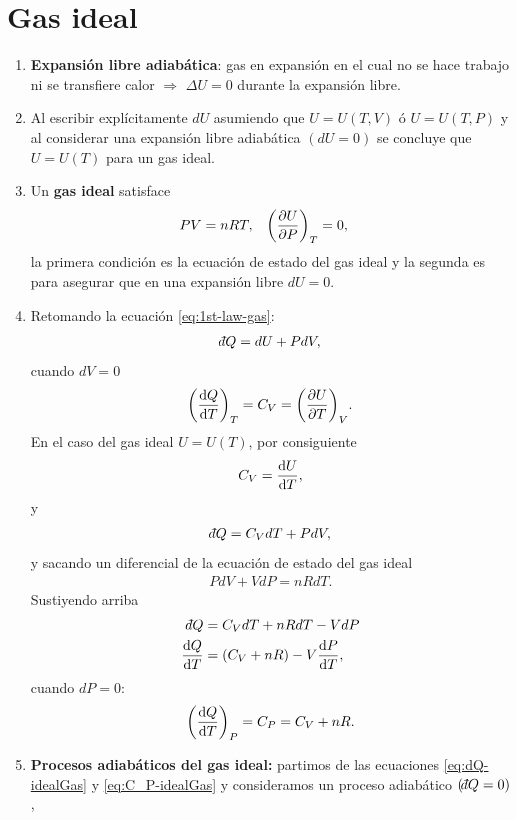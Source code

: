 \section{Gas ideal}
\begin{enumerate}
\item \textbf{Expansión libre adiabática}: gas en expansión en el 
cual no se hace trabajo ni se transfiere calor $\Rightarrow$ $\Delta U=0$
durante la expansión libre.
\item Al escribir explícitamente $dU$ asumiendo que $U=U(T,V)$ ó 
$U=U(T,P)$ y al considerar una expansión libre adiabática $(dU=0)$
se concluye que $U=U(T)$ para un gas ideal. 
\item Un \textbf{gas ideal} satisface
\begin{align}
  PV&=nRT, & \qty(\pdv{U}{P})_T&=0,
  \label{eq:ideal-gas}
\end{align}
la primera condición es la ecuación de estado del gas ideal y 
la segunda es para asegurar que en una expansión libre
$dU=0$.
\item Retomando la ecuación \eqref{eq:1st-law-gas}:
\begin{align*}
\dbar Q=dU+PdV,
\end{align*}
cuando $dV=0$
\begin{align*}
\qty(\dv{Q}{T})_T=C_V=\qty(\pdv{U}{T})_V.
\end{align*}
En el caso del gas ideal $U=U(T)$, por consiguiente
\begin{align*}
C_V=\dv{U}{T},
\end{align*}
y 
\begin{align}
\dbar Q = C_VdT+PdV,
\label{eq:dQ-idealGas}
\end{align}
y sacando un diferencial de la ecuación de estado del gas ideal
\begin{align*}
PdV+VdP=nRdT.
\end{align*}
Sustiyendo arriba
\begin{align*}
\dbar Q &= C_VdT + nRdT - VdP\\
\dv{Q}{T}&=\qty(C_V+nR)-V\dv{P}{T},
\end{align*}
cuando $dP=0$:
\begin{align}
\qty(\dv{Q}{T})_P=C_P=C_V+nR.
\label{eq:C_P-idealGas}
\end{align}
\item \textbf{Procesos adiabáticos del gas ideal:} partimos
de las ecuaciones \eqref{eq:dQ-idealGas} y \eqref{eq:C_P-idealGas}
y consideramos un proceso adiabático $(\dbar Q=0)$,
\begin{align*}

\end{align*}
\end{enumerate}
